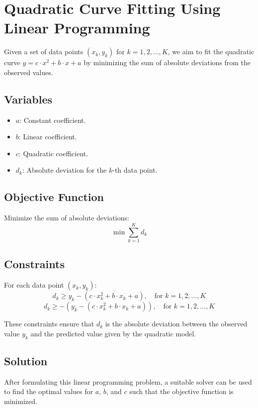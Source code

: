 \documentclass{article}
\begin{document}
\section*{Quadratic Curve Fitting Using Linear Programming}

Given a set of data points \((x_k, y_k)\) for \( k = 1, 2, \ldots, K\), we aim to fit the quadratic curve \( y = c \cdot x^2 + b \cdot x + a \) by minimizing the sum of absolute deviations from the observed values.

\subsection*{Variables}
\begin{itemize}
    \item \( a \): Constant coefficient.
    \item \( b \): Linear coefficient.
    \item \( c \): Quadratic coefficient.
    \item \( d_k \): Absolute deviation for the \( k \)-th data point.
\end{itemize}

\subsection*{Objective Function}
Minimize the sum of absolute deviations:
\[
\min \sum_{k=1}^{K} d_k
\]

\subsection*{Constraints}
For each data point \( (x_k, y_k) \):
\[
d_k \geq y_k - (c \cdot x_k^2 + b \cdot x_k + a), \quad \text{for } k = 1, 2, \ldots, K
\]
\[
d_k \geq -(y_k - (c \cdot x_k^2 + b \cdot x_k + a)), \quad \text{for } k = 1, 2, \ldots, K
\]

These constraints ensure that \( d_k \) is the absolute deviation between the observed value \( y_k \) and the predicted value given by the quadratic model.

\subsection*{Solution}
After formulating this linear programming problem, a suitable solver can be used to find the optimal values for \( a \), \( b \), and \( c \) such that the objective function is minimized.
\end{document}
